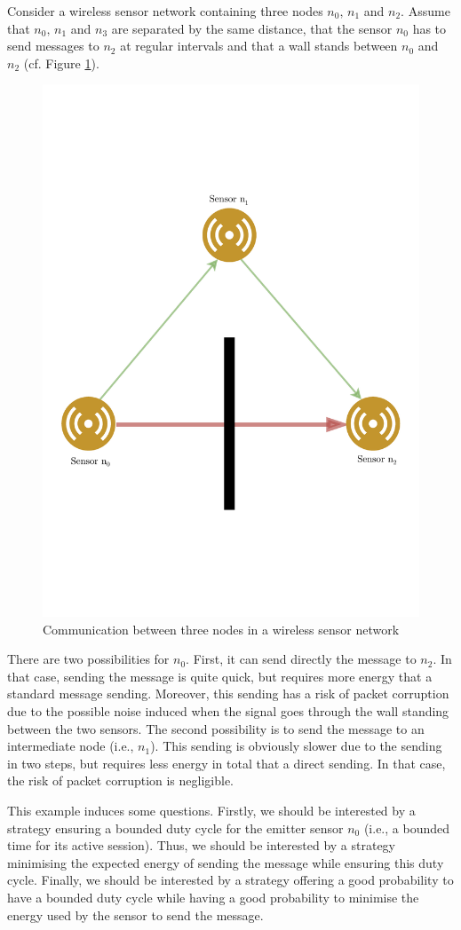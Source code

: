 \begin{example}\label{main-example}
Consider a wireless sensor network containing three nodes $n_0,\, n_1$ and $n_2$. Assume that $n_0, \, n_1$ and $n_3$ are separated by the same distance, that the sensor $n_0$ has to send messages to $n_2$ at regular intervals and that a wall stands between $n_0$ and $n_2$ (cf. Figure \ref{sensor_net}).
\begin{figure}[h!]
  \centering
  \includegraphics[width=0.7\linewidth]{resources/example3}
  \caption{Communication between three nodes in a wireless sensor network} \label{sensor_net}
\end{figure}
There are two possibilities for $n_0$. First, it can send directly the message to $n_2$. In that case, sending the message is quite quick, but requires more energy that a standard message sending. %
Moreover, this sending has a risk of packet corruption due to the possible noise induced when the signal goes through the wall standing between the two sensors.
The second possibility is to send the message to an intermediate node (i.e., $n_1$). This sending is obviously slower due to the sending in two steps, but requires less energy in total that a direct sending.
In that case, the risk of packet corruption is negligible. \par
This example induces some questions. Firstly, we should be interested by a strategy ensuring a bounded duty cycle for the emitter sensor $n_0$ (i.e., a bounded time for its active session).
Thus, we should be interested by a strategy minimising the expected energy of sending the message while ensuring this duty cycle.
Finally, we should be interested by a strategy offering a good probability to have a bounded duty cycle while having a good probability to minimise the energy used by the sensor to send the message.
\end{example}
